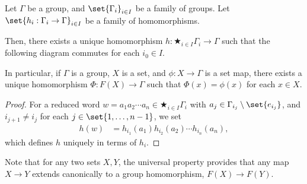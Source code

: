 \documentclass[10pt]{mypackage}
\begin{document}
\begin{theorem}
  Let $\Gamma$ be a group, and $\set{\Gamma_i}_{i\in I}$ be a family of groups. Let $\set{h_{i}:\Gamma_i\rightarrow \Gamma}_{i\in I}$ be a family of homomorphisms.\newline

  Then, there exists a unique homomorphism $h: \bigstar_{i\in I}\Gamma_{i}\rightarrow \Gamma$ such that the following diagram commutes for each $i_0\in I$.
  \begin{center}
  \end{center}
  In particular, if $\Gamma$ is a group, $X$ is a set, and $\phi: X\rightarrow \Gamma$ is a set map, there exists a unique homomorphism $\Phi: F(X)\rightarrow \Gamma$ such that $\Phi(x) = \phi(x)$ for each $x\in X$.
\end{theorem}
\begin{proof}
  For a reduced word $w = a_1a_2\cdots a_n\in \bigstar_{i\in I}\Gamma_i$ with $a_j\in \Gamma_{i_j}\setminus \set{e_{i_j}}$, and $i_{j+1}\neq i_{j}$ for each $j\in \set{1,\dots,n-1}$, we set
  \begin{align*}
    h\left(w\right) &= h_{i_1}\left(a_1\right)h_{i_2}\left(a_2\right)\cdots h_{i_n}\left(a_n\right),
  \end{align*}
  which defines $h$ uniquely in terms of $h_{i}$.
\end{proof}
Note that for any two sets $X,Y$, the universal property provides that any map $X\rightarrow Y$ extends canonically to a group homomorphism, $F(X) \rightarrow F(Y)$.
\begin{center}
\end{center}
\end{document}
